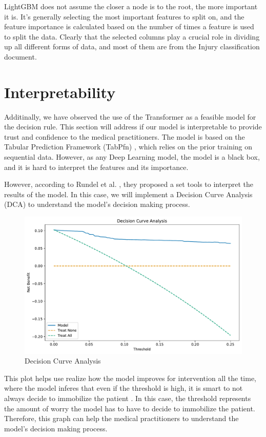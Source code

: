 \documentclass[10pt,letterpaper]{article}
\begin{document}
LightGBM does not assume the closer a node is to the root, the more important it is. It's generally selecting the most important features to split on, and the feature importance is calculated based on the number of times a feature is used to split the data. Clearly that the selected columns play a crucial role in dividing up all different forms of data, and most of them are from the Injury classification document. 

\section{Interpretability}

Additinally, we have observed the use of the Transformer as a feasible model for the decision rule. This section will address if our model is interpretable to provide
trust and confidence to the medical practitioners. The model is based on the Tabular Prediction Framework (TabPfn) \cite{hollmann2022tabpfn}, 
which relies on the prior training on sequential data. However, as any Deep Learning model, the model is a black box,
and it is hard to interpret the features and its importance. 

However, according to Rundel et al. \cite{rundel2024interpretable}, they proposed a set tools to interpret the results of the model.
In this case, we will implement a Decision Curve Analysis (DCA) to understand the model's decision making process.

\begin{figure}[H]
    \centering
    \includegraphics[width=0.5\linewidth]{../plots/tabpfn_decision_curve.pdf}
    \caption{Decision Curve Analysis}
    \label{fig:dca}
\end{figure}

This plot helps use realize how the model improves for intervention all the time, where the model inferes that even if the threshold is high, it is smart to not 
always decide to immobilize the patient \cite{vickers2019simple}. In this case, the threshold 
represents the amount of worry the model has to have to decide to immobilize the patient. Therefore, this graph 
can help the medical practitioners to understand the model's decision making process.
\end{document}
